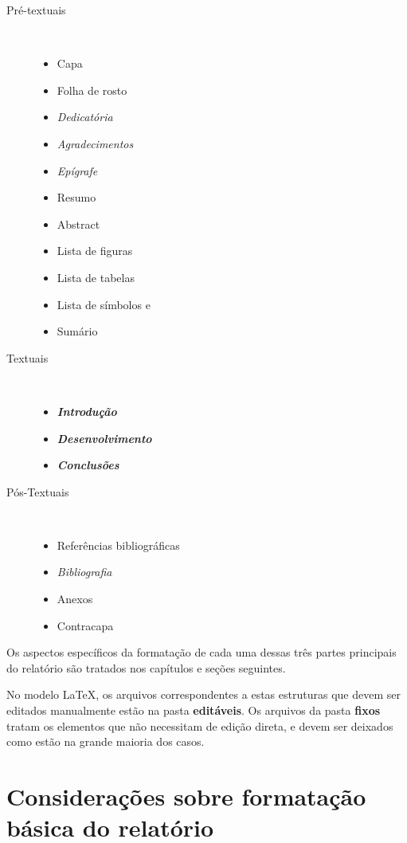 \begin{description}
	\item [Pré-textuais] \

	\begin{itemize}
		\item Capa
		\item Folha de rosto
		\item \textit{Dedicatória}
		\item \textit{Agradecimentos}
		\item \textit{Epígrafe}
		\item Resumo
		\item Abstract
		\item Lista de figuras
		\item Lista de tabelas
		\item Lista de símbolos e
		\item Sumário
	\end{itemize}

	\item [Textuais] \

	\begin{itemize}
		\item \textbf{\textit{Introdução}}
		\item \textbf{\textit{Desenvolvimento}}
		\item \textbf{\textit{Conclusões}}
	\end{itemize}

	\item [Pós-Textuais] \
	
	\begin{itemize}
		\item Referências bibliográficas
		\item \textit{Bibliografia}
		\item Anexos
		\item Contracapa
	\end{itemize}
\end{description}

Os aspectos específicos da formatação de cada uma dessas três partes 
principais do relatório são tratados nos capítulos e seções seguintes.

No modelo \LaTeX, os arquivos correspondentes a estas estruturas que devem
ser editados manualmente estão na pasta \textbf{editáveis}. Os arquivos
da pasta \textbf{fixos} tratam os elementos que não necessitam de 
edição direta, e devem ser deixados como estão na grande maioria dos casos.

\section{Considerações sobre formatação básica do relatório}

